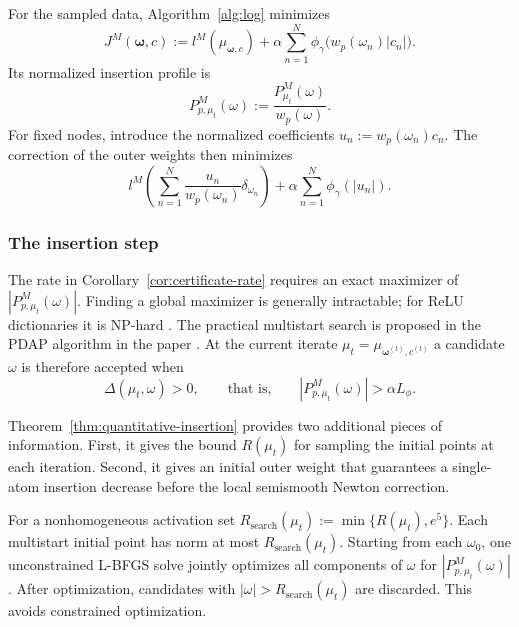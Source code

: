 \documentclass[11pt]{amsart}
\theoremstyle{definition}
\theoremstyle{remark}
\begin{document}
For the sampled data, Algorithm~\ref{alg:log} minimizes
\begin{equation}
\label{eq:empirical-log-objective}
	J^M(\boldsymbol\omega,c)
	:=l^M(\mu_{\boldsymbol\omega,c})
	+\alpha\sum_{n=1}^N
		\phi_\gamma\bigl(w_p(\omega_n)|c_n|\bigr).
\end{equation}
Its normalized insertion profile is
\begin{equation*}
	P^M_{p,\mu_t}(\omega):=
	\frac{P^M_{\mu_t}(\omega)}{w_p(\omega)}.
\end{equation*}
For fixed nodes, introduce the normalized coefficients
$u_n:=w_p(\omega_n)c_n$. The correction of the outer weights then minimizes
\begin{equation*}
	l^M\left(\sum_{n=1}^N
	\frac{u_n}{w_p(\omega_n)}\delta_{\omega_n}\right)
	+\alpha\sum_{n=1}^N\phi_\gamma(|u_n|).
\end{equation*}



\subsubsection*{The insertion step}
The rate in Corollary~\ref{cor:certificate-rate} requires an exact maximizer
of $|P^M_{p,\mu_t}(\omega)|$.
Finding a global maximizer is generally intractable; for ReLU dictionaries it
is NP-hard \cite[Section~3.3]{bach2017breaking}. The practical multistart
search is proposed in the PDAP algorithm in the paper \cite{pieper2022nonconvex}.
At the current iterate $\mu_t=\mu_{\boldsymbol\omega^{(t)},c^{(t)}}$ a
candidate $\omega$ is therefore accepted when
\begin{equation}
\label{eq:empirical-insertion-condition}
	\Delta(\mu_t,\omega)>0,
	\qquad\text{that is,}\qquad
	|P^M_{p,\mu_t}(\omega)|>\alpha L_\phi.
\end{equation}

Theorem~\ref{thm:quantitative-insertion} provides two additional pieces of
information. First, it gives the bound $R(\mu_t)$ for sampling the initial
points at each iteration. Second, it gives an initial outer weight that
guarantees a single-atom insertion decrease before the local semismooth Newton
correction.

For a nonhomogeneous activation set
$R_{\mathrm{search}}(\mu_t):=\min\{R(\mu_t),e^5\}$.
Each multistart initial point has norm at most $R_{\mathrm{search}}(\mu_t)$.
Starting from each $\omega_0$, one unconstrained L-BFGS solve jointly optimizes all components of $\omega$ for
$|P^M_{p,\mu_t}(\omega)|$.
After optimization, candidates with $|\omega|>R_{\mathrm{search}}(\mu_t)$ are discarded.
This avoids constrained optimization.
\end{document}
